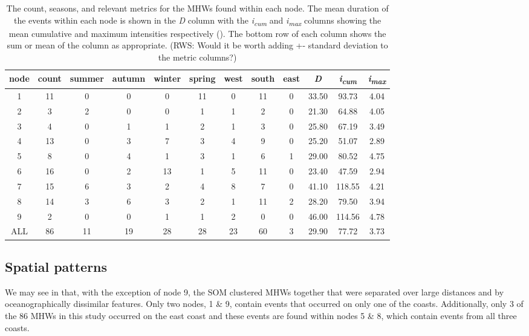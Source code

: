 \documentclass[a4paper,10pt,review]{elsarticle}
\begin{document}
\begin{table}[ht]
\caption{\small The count, seasons, and relevant metrics for the MHWs found within each node. The mean duration of the events within each node is shown in the \emph{D} column with the \emph{i\textsubscript{cum}} and \emph{i\textsubscript{max}} columns showing the mean cumulative and maximum intensities respectively (). The bottom row of each column shows the sum or mean of the column as appropriate. (RWS: Would it be worth adding +- standard deviation to the metric columns?)}
\label{table2}
\centering
\tiny
\begin{tabular}{cccccccccccc}
  \toprule
node & count & summer & autumn & winter & spring & west & south & east & \emph{D} & \emph{i\textsubscript{cum}} & \emph{i\textsubscript{max}} \\
  \midrule
  1 &  11 &   0 &   0 &   0 &  11 &   0 &  11 &   0 & 33.50 & 93.73 & 4.04 \\
  2 &   3 &   2 &   0 &   0 &   1 &   1 &   2 &   0 & 21.30 & 64.88 & 4.05 \\
  3 &   4 &   0 &   1 &   1 &   2 &   1 &   3 &   0 & 25.80 & 67.19 & 3.49 \\
  4 &  13 &   0 &   3 &   7 &   3 &   4 &   9 &   0 & 25.20 & 51.07 & 2.89 \\
  5 &   8 &   0 &   4 &   1 &   3 &   1 &   6 &   1 & 29.00 & 80.52 & 4.75 \\
  6 &  16 &   0 &   2 &  13 &   1 &   5 &  11 &   0 & 23.40 & 47.59 & 2.94 \\
  7 &  15 &   6 &   3 &   2 &   4 &   8 &   7 &   0 & 41.10 & 118.55 & 4.21 \\
  8 &  14 &   3 &   6 &   3 &   2 &   1 &  11 &   2 & 28.20 & 79.50 & 3.94 \\
  9 &   2 &   0 &   0 &   1 &   1 &   2 &   0 &   0 & 46.00 & 114.56 & 4.78 \\
  ALL &  86 &  11 &  19 &  28 &  28 &  23 &  60 &   3 & 29.90 & 77.72 & 3.73 \\
  \bottomrule
  \end{tabular}
\end{table}

\subsection{Spatial patterns}
We may see in  that, with the exception of node 9, the SOM clustered MHWs together that were separated over large distances and by oceanographically dissimilar features. Only two nodes, 1 \& 9, contain events that occurred on only one of the coasts. Additionally, only 3 of the 86 MHWs in this study occurred on the east coast and these events are found within nodes 5 \& 8, which contain events from all three coasts.
\end{document}
